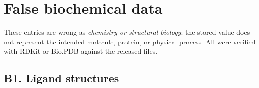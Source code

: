 \documentclass[11pt,a4paper]{article}
\begin{document}
\section{False biochemical data}

These entries are wrong as \emph{chemistry or structural biology}: the
stored value does not represent the intended molecule, protein, or physical
process. All were verified with RDKit or Bio.PDB against the released files.

\subsection{B1. Ligand structures}
\end{document}
